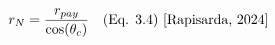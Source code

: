\documentclass[preview]{standalone}
\begin{document}
\begin{align*}
\special{dvisvgm:raw <g id='unique000'>}r_N = \frac{r_{pay}}{\cos(\theta_c)} \quad \text{(Eq. 3.4) [Rapisarda, 2024]}\special{dvisvgm:raw </g>}
\end{align*}
\end{document}
